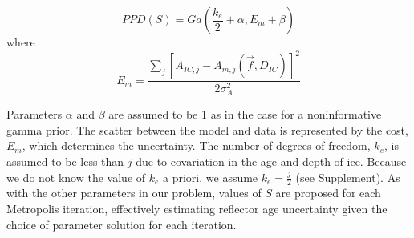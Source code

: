 \begin{equation}\label{eqn:S}
PPD(S) = Ga(\frac{k_e}{2}+\alpha, E_m+\beta)
\end{equation}
where 
\begin{equation}
 E_m= \frac{\sum_{j}[A_{IC,j} - A_{m,j}(\vec{f},D_{IC})]^2}{2\sigma_A^2} 
\end{equation}

Parameters $\alpha$ and $\beta$ are assumed to be 1 as in the case for a noninformative gamma prior. The scatter between the model and data is represented by the cost, $E_m$, which determines the uncertainty. The number of degrees of freedom, $k_e$, is assumed to be less than $j$ due to covariation in the age and depth of ice. Because we do not know the value of $k_e$ a priori, we assume $k_e = \frac{j}{2}$ (see Supplement). As with the other parameters in our problem, values of $S$ are proposed for each Metropolis iteration, effectively estimating reflector age uncertainty given the choice of parameter solution for each iteration.



%

%


